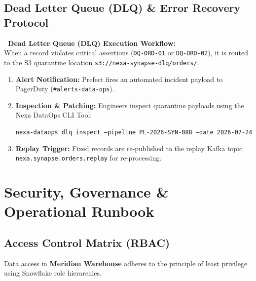 \documentclass[10pt, a4paper]{article}
\begin{document}
\subsection{Dead Letter Queue (DLQ) \& Error Recovery Protocol}
\begin{tcolorbox}[calloutbox]
\scriptsize \textcolor{PrimaryBlue}{\textbf{\faLock\ Dead Letter Queue (DLQ) Execution Workflow:}} \\[2pt]
When a record violates critical assertions (\texttt{DQ-ORD-01} or \texttt{DQ-ORD-02}), it is routed to the S3 quarantine location \texttt{s3://nexa-synapse-dlq/orders/}. 
\begin{enumerate}[leftmargin=1.5em, itemsep=1pt, topsep=1pt]
    \item \textbf{Alert Notification:} Prefect fires an automated incident payload to PagerDuty (\texttt{\#alerts-data-ops}).
    \item \textbf{Inspection \& Patching:} Engineers inspect quarantine payloads using the Nexa DataOps CLI Tool:
    \begin{center}
    \texttt{\scriptsize nexa-dataops dlq inspect --pipeline PL-2026-SYN-088 --date 2026-07-24}
    \end{center}
    \item \textbf{Replay Trigger:} Fixed records are re-published to the replay Kafka topic \texttt{nexa.synapse.orders.replay} for re-processing.
\end{enumerate}
\end{tcolorbox}

\section{Security, Governance \& Operational Runbook}

\subsection{Access Control Matrix (RBAC)}
Data access in \textbf{Meridian Warehouse} adheres to the principle of least privilege using Snowflake role hierarchies.

\vspace{2pt}
\end{document}
